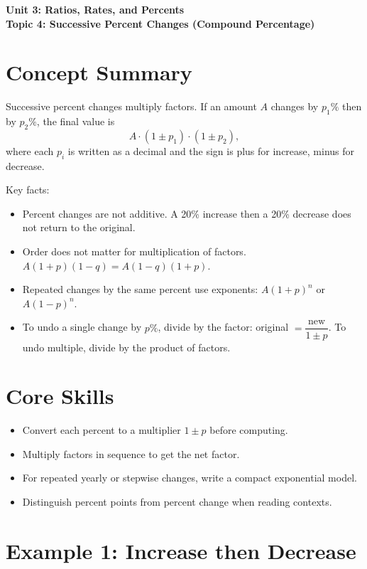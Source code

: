 \documentclass[12pt]{article}
\begin{document}
\begin{center}
    \LARGE \textbf{Unit 3: Ratios, Rates, and Percents} \\[6pt]
    \Large \textbf{Topic 4: Successive Percent Changes (Compound Percentage)}
\end{center}

\vspace{1em}

\section*{Concept Summary}

Successive percent changes multiply factors.  
If an amount \(A\) changes by \(p_1\%\) then by \(p_2\%\), the final value is
\[
A\cdot (1\pm p_1)\cdot (1\pm p_2),
\]
where each \(p_i\) is written as a decimal and the sign is plus for increase, minus for decrease.

Key facts:
\begin{itemize}
  \item Percent changes are not additive. A 20\% increase then a 20\% decrease does not return to the original.
  \item Order does not matter for multiplication of factors. \(A(1+p)(1-q) = A(1-q)(1+p)\).
  \item Repeated changes by the same percent use exponents: \(A(1+p)^n\) or \(A(1-p)^n\).
  \item To undo a single change by \(p\%\), divide by the factor: original \(=\dfrac{\text{new}}{1\pm p}\). To undo multiple, divide by the product of factors.
\end{itemize}

\section*{Core Skills}
\begin{itemize}
  \item Convert each percent to a multiplier \(1\pm p\) before computing.
  \item Multiply factors in sequence to get the net factor.
  \item For repeated yearly or stepwise changes, write a compact exponential model.
  \item Distinguish percent points from percent change when reading contexts.
\end{itemize}

\section*{Example 1: Increase then Decrease}
\end{document}
